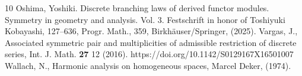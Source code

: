 \documentclass[12pt]{amsart}
\theoremstyle{definition}
\theoremstyle{remark}
\numberwithin{equation}{section}
\begin{document}
\begin{thebibliography}{10}
      Oshima, Yoshiki. Discrete branching laws of derived functor modules. Symmetry in geometry and analysis.
Vol. 3. Festschrift in honor of Toshiyuki Kobayashi, 127–636, Progr. Math., 359, Birkhäuser/Springer,     (2025).
 Vargas, J.,
Associated symmetric pair and multiplicities of admissible restriction of discrete series,
Int. J. Math. \textbf{27}   12 (2016). https://doi.org/10.1142/S0129167X16501007
 Wallach, N., Harmonic analysis on homogeneous spaces, Marcel Deker, (1974).
\end{thebibliography}
\end{document}
